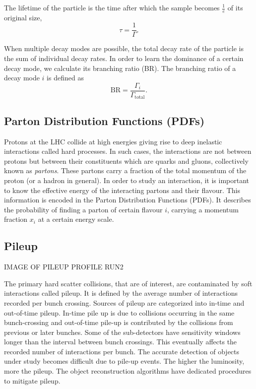 The lifetime of the particle is the time after which the sample becomes $\frac{1}{e}$ of its original 
size,
\begin{equation}
    \tau = \frac{1}{\Gamma}.
\end{equation}

When multiple decay modes are possible, the total decay rate of the particle is the sum of individual 
decay rates. In order to learn the dominance of a certain decay mode, we calculate its branching 
ratio (BR). The branching ratio of a decay mode $i$ is defined as
\begin{equation}
    \text{BR} = \frac{\Gamma_i}{\Gamma_{\text{total}}}.
\end{equation}


\subsection*{Parton Distribution Functions (PDFs)}
Protons at the LHC collide at high energies giving rise to deep inelastic interactions called hard processes.
In such cases, the interactions are not between protons but between their constituents which are
quarks and gluons, collectively known as \textit{partons}. These partons carry a fraction of the total
momentum of the proton (or a hadron in general). In order to study an interaction, it is important to
know the effective energy of the interacting partons and their flavour. This information is encoded in 
the Parton Distribution Functions (PDFs). It describes the probability of finding a parton of 
certain flavour $i$, carrying a momentum fraction $x_i$ at a certain energy scale.

\subsection*{Pileup}

IMAGE OF PILEUP PROFILE RUN2

The 
primary hard scatter collisions, that are of interest, are contaminated by soft interactions 
called pileup. It is defined by the average number of interactions
recorded per bunch crossing. Sources of pileup are categorized into in-time and out-of-time pileup. In-time pile up is due to collisions
occurring in the same bunch-crossing and out-of-time pile-up is contributed by the collisions from previous
or later bunches. Some of the sub-detectors have sensitivity windows longer than the interval between
bunch crossings. This eventually affects the recorded number of interactions per bunch. The accurate
detection of objects under study becomes difficult due to pile-up events. The higher the 
luminosity, more the pileup. The object reconstruction algorithms have dedicated procedures 
to mitigate pileup.

